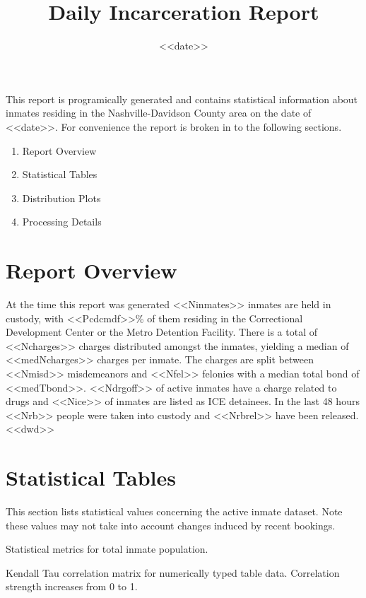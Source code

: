 \documentclass{article}
\title{Daily Incarceration Report}
\date{<<date>>}
\begin{document}
    
\maketitle
This report is programically generated and contains statistical information about inmates residing in the Nashville-Davidson County area on the date of <<date>>. For convenience the report is broken in to the following sections.
    
\begin{enumerate}
\item Report Overview
\item Statistical Tables
\item Distribution Plots
\item Processing Details
\end{enumerate}
    
\section{Report Overview}
 At the time this report was generated <<Ninmates>> inmates are held in custody, with <<Pcdcmdf>>\% of them residing in the Correctional Development Center or the Metro Detention Facility. There is a total of <<Ncharges>> charges distributed amongst the inmates, yielding a median of <<medNcharges>> charges per inmate. The charges are split between <<Nmisd>> misdemeanors and <<Nfel>> felonies with a median total bond of <<medTbond>>. <<Ndrgoff>> of active inmates have a charge related to drugs and <<Nice>> of inmates are listed as  ICE detainees. In the last 48 hours <<Nrb>> people were taken into custody and <<Nrbrel>> have been released. <<dwd>>

\section{Statistical Tables}
This section lists statistical values concerning the active inmate dataset. Note these values may not take into account changes induced by recent bookings.

\begin{table}[H]
\centering
\noindent\makebox[\textwidth]{%
}
\caption{Statistical metrics for total inmate population.}
\label{Tab:metrics}
\end{table}

\begin{table}[H]
\centering
\noindent\makebox[\textwidth]{%
}
\caption{Kendall Tau correlation matrix for numerically typed table data. Correlation strength increases from 0 to 1.}
\label{Tab:kendall}
\end{table}
\end{document}
